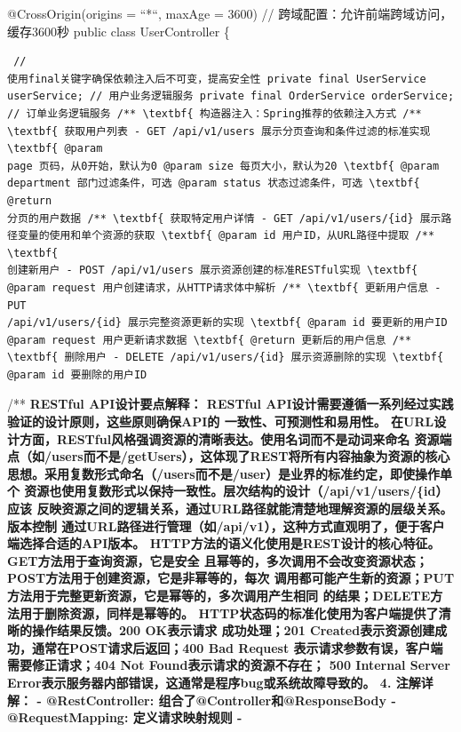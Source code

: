 @CrossOrigin(origins = ``*``, maxAge = 3600) // 跨域配置：允许前端跨域访问，缓存3600秒 public class UserController \{ \begin{verbatim} //
使用final关键字确保依赖注入后不可变，提高安全性 private final UserService userService; // 用户业务逻辑服务 private final OrderService orderService;
// 订单业务逻辑服务 /** \textbf{ 构造器注入：Spring推荐的依赖注入方式 /** \textbf{ 获取用户列表 - GET /api/v1/users 展示分页查询和条件过滤的标准实现 \textbf{ @param
page 页码，从0开始，默认为0 @param size 每页大小，默认为20 \textbf{ @param department 部门过滤条件，可选 @param status 状态过滤条件，可选 \textbf{ @return
分页的用户数据 /** \textbf{ 获取特定用户详情 - GET /api/v1/users/{id} 展示路径变量的使用和单个资源的获取 \textbf{ @param id 用户ID，从URL路径中提取 /** \textbf{
创建新用户 - POST /api/v1/users 展示资源创建的标准RESTful实现 \textbf{ @param request 用户创建请求，从HTTP请求体中解析 /** \textbf{ 更新用户信息 - PUT
/api/v1/users/{id} 展示完整资源更新的实现 \textbf{ @param id 要更新的用户ID @param request 用户更新请求数据 \textbf{ @return 更新后的用户信息 /**
\textbf{ 删除用户 - DELETE /api/v1/users/{id} 展示资源删除的实现 \textbf{ @param id 要删除的用户ID \end{verbatim} /** \textbf{ RESTful
API设计要点解释： RESTful API设计需要遵循一系列经过实践验证的设计原则，这些原则确保API的 \textbf{ 一致性、可预测性和易用性。 \textbf{
在\textbf{URL设计}方面，RESTful风格强调资源的清晰表达。使用名词而不是动词来命名 资源端点（如/users而不是/getUsers），这体现了REST将所有内容抽象为资源的核心 \textbf{
思想。采用复数形式命名（/users而不是/user）是业界的标准约定，即使操作单个 资源也使用复数形式以保持一致性。层次结构的设计（/api/v1/users/\{id}）应该 \textbf{
反映资源之间的逻辑关系，通过URL路径就能清楚地理解资源的层级关系。版本控制 通过URL路径进行管理（如/api/v1），这种方式直观明了，便于客户端选择合适的API版本。 \textbf{
\textbf{HTTP方法的语义化使用}是REST设计的核心特征。GET方法用于查询资源，它是安全 \textbf{ 且幂等的，多次调用不会改变资源状态；POST方法用于创建资源，它是非幂等的，每次
调用都可能产生新的资源；PUT方法用于完整更新资源，它是幂等的，多次调用产生相同 \textbf{ 的结果；DELETE方法用于删除资源，同样是幂等的。 \textbf{
\textbf{HTTP状态码的标准化使用}为客户端提供了清晰的操作结果反馈。200 OK表示请求 成功处理；201 Created表示资源创建成功，通常在POST请求后返回；400 Bad Request \textbf{
表示请求参数有误，客户端需要修正请求；404 Not Found表示请求的资源不存在； 500 Internal Server Error表示服务器内部错误，这通常是程序bug或系统故障导致的。 \textbf{ 4. 注解详解：
\textbf{ - @RestController: 组合了@Controller和@ResponseBody - @RequestMapping: 定义请求映射规则 \textbf{ -
}}}}}}}}}}}}
